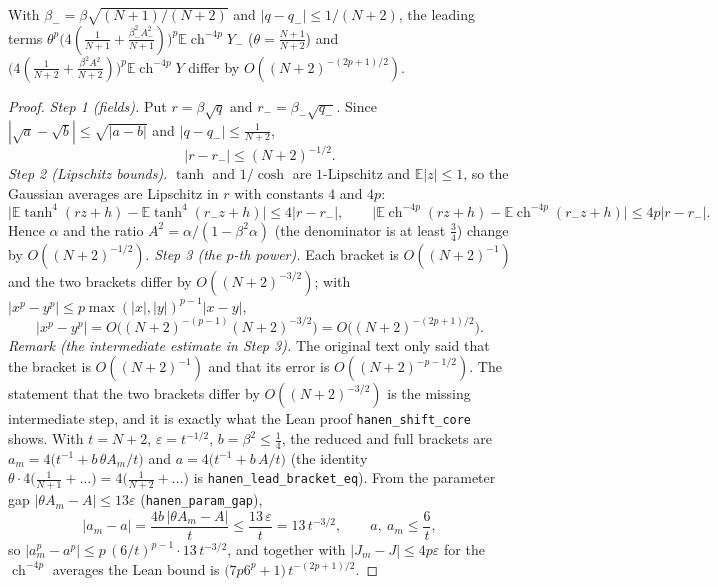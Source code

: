 \begin{lemma}\label{lem:sg-tal:hanen-leading-shift}
\leanok
{}
With $\beta_-=\beta\sqrt{(N+1)/(N+2)}$ and $|q-q_-|\le 1/(N+2)$, the leading terms
$\theta^p\bigl(4(\tfrac1{N+1}+\tfrac{\beta_-^2A_-^2}{N+1})\bigr)^p\mathbb E\operatorname{ch}^{-4p}Y_-$ ($\theta=\tfrac{N+1}{N+2}$) and
$\bigl(4(\tfrac1{N+2}+\tfrac{\beta^2A^2}{N+2})\bigr)^p\mathbb E\operatorname{ch}^{-4p}Y$ differ by $O((N+2)^{-(2p+1)/2})$.
\end{lemma}
\begin{proof}
\leanok
\emph{Step 1 (fields).} Put $r=\beta\sqrt q$ and $r_-=\beta_-\sqrt{q_-}$. Since $|\sqrt a-\sqrt b|\le\sqrt{|a-b|}$ and $|q-q_-|\le\frac1{N+2}$,
\[
|r-r_-|\le(N+2)^{-1/2}.
\]
\emph{Step 2 (Lipschitz bounds).} $\tanh$ and $1/\!\cosh$ are $1$-Lipschitz and $\mathbb E|z|\le1$, so the Gaussian averages are Lipschitz in $r$ with constants $4$ and $4p$:
\[
\big|\mathbb E\tanh^4(rz+h)-\mathbb E\tanh^4(r_-z+h)\big|\le4|r-r_-|,\qquad
\big|\mathbb E\operatorname{ch}^{-4p}(rz+h)-\mathbb E\operatorname{ch}^{-4p}(r_-z+h)\big|\le4p|r-r_-| .
\]
Hence $\alpha$ and the ratio $A^2=\alpha/(1-\beta^2\alpha)$ (the denominator is at least $\frac34$) change by $O((N+2)^{-1/2})$.
\emph{Step 3 (the $p$-th power).} Each bracket is $O((N+2)^{-1})$ and the two brackets differ by $O((N+2)^{-3/2})$; with $|x^p-y^p|\le p\max(|x|,|y|)^{p-1}|x-y|$,
\[
\Big|x^p-y^p\Big|=O\big((N+2)^{-(p-1)}(N+2)^{-3/2}\big)=O\big((N+2)^{-(2p+1)/2}\big).
\]
\emph{Remark (the intermediate estimate in Step 3).} The original text only said that the bracket is $O((N+2)^{-1})$ and that its error is $O((N+2)^{-p-1/2})$. The statement that the two brackets differ by $O((N+2)^{-3/2})$ is the missing intermediate step, and it is exactly what the Lean proof \texttt{hanen\_shift\_core} shows. With $t=N+2$, $\varepsilon=t^{-1/2}$, $b=\beta^2\le\frac14$, the reduced and full brackets are $a_m=4\big(t^{-1}+b\,\theta A_m/t\big)$ and $a=4\big(t^{-1}+b\,A/t\big)$ (the identity $\theta\cdot4\big(\frac1{N+1}+\dots\big)=4\big(\frac1{N+2}+\dots\big)$ is \texttt{hanen\_lead\_bracket\_eq}). From the parameter gap $|\theta A_m-A|\le13\varepsilon$ (\texttt{hanen\_param\_gap}),
\[
|a_m-a|=\frac{4b\,|\theta A_m-A|}t\le\frac{13\,\varepsilon}t=13\,t^{-3/2},\qquad a,\ a_m\le\frac6t ,
\]
so $|a_m^p-a^p|\le p\,(6/t)^{p-1}\cdot13\,t^{-3/2}$, and together with $|J_m-J|\le4p\varepsilon$ for the $\operatorname{ch}^{-4p}$ averages the Lean bound is $\big(7p6^p+1\big)\,t^{-(2p+1)/2}$.
\end{proof}

